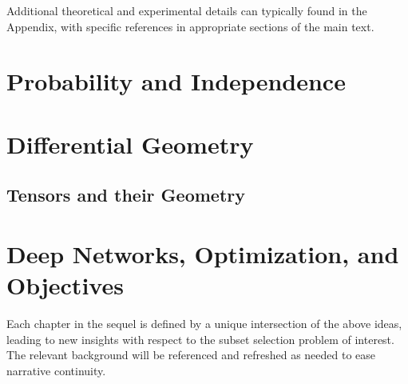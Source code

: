 Additional theoretical and experimental details can typically found in the Appendix, with specific references in appropriate sections of the main text. 

\section{Probability and Independence}


\section{Differential Geometry}\label{sec:diffgeom}


\subsection{Tensors and their Geometry}


\section{Deep Networks, Optimization, and Objectives}


Each chapter in the sequel
is defined by a unique intersection
of the above ideas, leading to new insights
with respect to the subset selection problem of interest.
The relevant background will be referenced and refreshed 
as needed to ease narrative continuity.